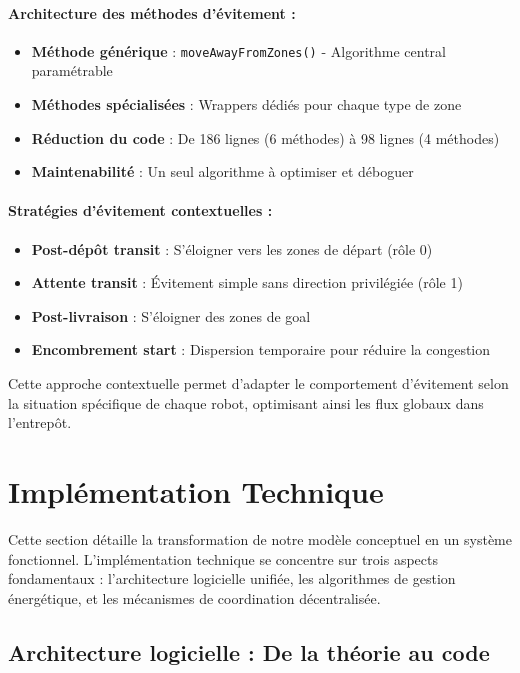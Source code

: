 \documentclass[12pt,a4paper]{article}
\newcommand{\code}[1]{\texttt{#1}}
\begin{document}
\paragraph{Architecture des méthodes d'évitement :}

\begin{itemize}
    \item \textbf{Méthode générique} : \code{moveAwayFromZones()} - Algorithme central paramétrable
    \item \textbf{Méthodes spécialisées} : Wrappers dédiés pour chaque type de zone
    \item \textbf{Réduction du code} : De 186 lignes (6 méthodes) à 98 lignes (4 méthodes)
    \item \textbf{Maintenabilité} : Un seul algorithme à optimiser et déboguer
\end{itemize}

\paragraph{Stratégies d'évitement contextuelles :}

\begin{itemize}
    \item \textbf{Post-dépôt transit} : S'éloigner vers les zones de départ (rôle 0)
    \item \textbf{Attente transit} : Évitement simple sans direction privilégiée (rôle 1)
    \item \textbf{Post-livraison} : S'éloigner des zones de goal
    \item \textbf{Encombrement start} : Dispersion temporaire pour réduire la congestion
\end{itemize}

Cette approche contextuelle permet d'adapter le comportement d'évitement selon la situation spécifique de chaque robot, optimisant ainsi les flux globaux dans l'entrepôt.

\section{Implémentation Technique}

Cette section détaille la transformation de notre modèle conceptuel en un système fonctionnel. L'implémentation technique se concentre sur trois aspects fondamentaux : l'architecture logicielle unifiée, les algorithmes de gestion énergétique, et les mécanismes de coordination décentralisée.

\subsection{Architecture logicielle : De la théorie au code}
\end{document}
